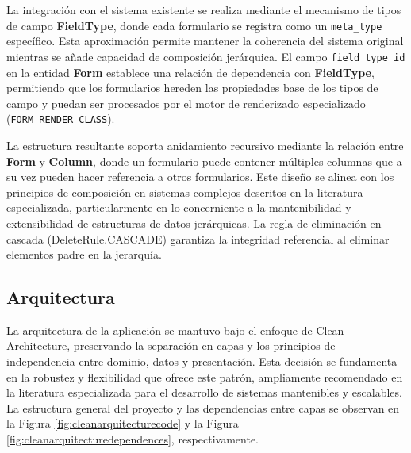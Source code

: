\documentclass{article}
\begin{document}
La integración con el sistema existente se realiza mediante el mecanismo de tipos de campo \textbf{FieldType}, donde cada formulario se registra como un \texttt{meta\_type} específico. Esta aproximación permite mantener la coherencia del sistema original mientras se añade capacidad de composición jerárquica. El campo \texttt{field\_type\_id} en la entidad \textbf{Form} establece una relación de dependencia con \textbf{FieldType}, permitiendo que los formularios hereden las propiedades base de los tipos de campo y puedan ser procesados por el motor de renderizado especializado (\texttt{FORM\_RENDER\_CLASS}).

La estructura resultante soporta anidamiento recursivo mediante la relación entre \textbf{Form} y \textbf{Column}, donde un formulario puede contener múltiples columnas que a su vez pueden hacer referencia a otros formularios. Este diseño se alinea con los principios de composición en sistemas complejos descritos en la literatura especializada, particularmente en lo concerniente a la mantenibilidad y extensibilidad de estructuras de datos jerárquicas. La regla de eliminación en cascada (DeleteRule.CASCADE) garantiza la integridad referencial al eliminar elementos padre en la jerarquía.

\subsection{Arquitectura}

La arquitectura de la aplicación se mantuvo bajo el enfoque de Clean Architecture, preservando la separación en capas y los principios de independencia entre dominio, datos y presentación. Esta decisión se fundamenta en la robustez y flexibilidad que ofrece este patrón, ampliamente recomendado en la literatura especializada para el desarrollo de sistemas mantenibles y escalables. La estructura general del proyecto y las dependencias entre capas se observan en la Figura \ref{fig:cleanarquitecturecode} y la Figura \ref{fig:cleanarquitecturedependences}, respectivamente.
\end{document}
